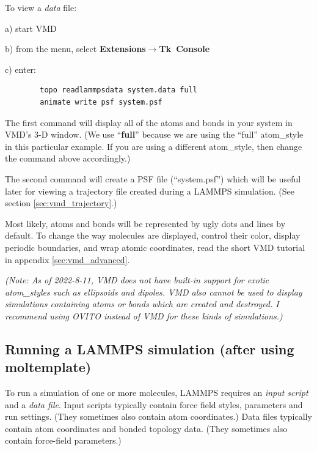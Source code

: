 \documentclass[11pt]{article}
\begin{document}
To view a \textit{data} file:
\begin{list}{}
\item a) start VMD
\item b) from the menu, select 
         \textbf{Extensions}$\rightarrow$\mbox{\textbf{Tk Console}} 
\item c) enter:
\end{list}
\begin{verbatim}
        topo readlammpsdata system.data full
        animate write psf system.psf
\end{verbatim}
\begin{list}{}
\item The first command will display all of the atoms and bonds in your system
in VMD's 3-D window.  (We use ``\textbf{full}'' because we are using the 
``full'' atom\_style in this particular example.  If you are using a different 
atom\_style, then change the command above accordingly.)
\item The second command
will create a PSF file (``system.psf'') which will 
be useful later for viewing a trajectory file created 
during a LAMMPS simulation.
(See section \ref{sec:vmd_trajectory}.)
\end{list}

Most likely, atoms and bonds will be represented by 
ugly dots and lines by default. 
To change the way molecules are displayed, control their color, 
display periodic boundaries, and wrap atomic coordinates,  
read the short VMD tutorial in appendix \ref{sec:vmd_advanced}.

\textit{(Note:
As of 2022-8-11,
VMD does not have built-in support for exotic atom\_styles 
such as ellipsoids and dipoles.
VMD also cannot be used to display simulations
containing atoms or bonds which are created and destroyed.
I recommend using OVITO \cite{OVITO}
instead of VMD for these kinds of simulations.)}



\subsection{Running a LAMMPS simulation (after using moltemplate)}
\label{sec:run}
To run a simulation of one or more molecules, 
LAMMPS requires an \textit{input script} and a \textit{data file}.
Input scripts typically contain
force field styles, parameters and run settings.
(They sometimes also contain atom coordinates.)
Data files typically contain atom coordinates and bonded topology data.
(They sometimes also contain force-field parameters.)
\end{document}
